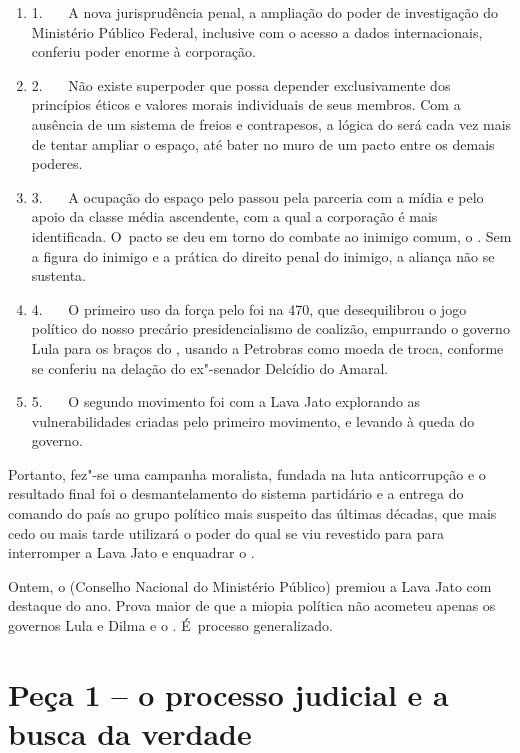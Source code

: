 \begin{enumerate}
\itemsep1pt\parskip0pt
\item
  1.~~~ A nova jurisprudência penal, a ampliação do poder de
  investigação do Ministério Público Federal, inclusive com o acesso a
  dados internacionais, conferiu poder enorme à corporação.
\item
  2.~~~ Não existe superpoder que possa depender exclusivamente dos
  princípios éticos e valores morais individuais de seus membros. Com a
  ausência de um sistema de freios e contrapesos, a lógica do  será
  cada vez mais de tentar ampliar o espaço, até bater no muro de um
  pacto entre os demais poderes.
\item
  3.~~~ A ocupação do espaço pelo  passou pela parceria com a mídia e
  pelo apoio da classe média ascendente, com a qual a corporação é mais
  identificada. O~pacto se deu em torno do combate ao inimigo comum, o
  . Sem a figura do inimigo e a prática do direito penal do inimigo, a
  aliança não se sustenta.
\item
  4.~~~ O primeiro uso da força pelo  foi na  470, que
  desequilibrou o jogo político do nosso precário presidencialismo de
  coalizão, empurrando o governo Lula para os braços do , usando a
  Petrobras como moeda de troca, conforme se conferiu na delação do
  ex"-senador Delcídio do Amaral.
\item
  5.~~~ O segundo movimento foi com a Lava Jato explorando as
  vulnerabilidades criadas pelo primeiro movimento, e levando à queda do
  governo.
\end{enumerate}

Portanto, fez"-se uma campanha moralista, fundada na luta anticorrupção e
o resultado final foi o desmantelamento do sistema partidário e a
entrega do comando do país ao grupo político mais suspeito das últimas
décadas, que mais cedo ou mais tarde utilizará o poder do qual se viu
revestido para para interromper a Lava Jato e enquadrar o .

Ontem, o  (Conselho Nacional do Ministério Público) premiou a Lava
Jato com destaque do ano. Prova maior de que a miopia política não
acometeu apenas os governos Lula e Dilma e o . É~processo
generalizado.

\section{Peça 1 -- o processo judicial e a busca da verdade}


